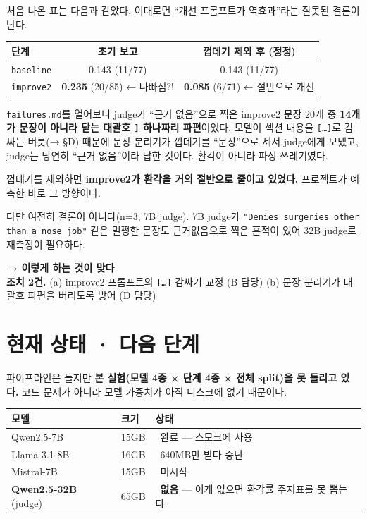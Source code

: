 \documentclass[10.5pt,a4paper]{article}
\renewcommand{\emph}[1]{{\color{muted}#1}}
\newcommand{\proposal}[1]{%
\begin{tcolorbox}[enhanced, breakable, colback=softgray, boxrule=0pt, frame hidden,
  borderline west={3pt}{0pt}{navy}, arc=0pt,
  left=12pt, right=10pt, top=8pt, bottom=8pt, before skip=12pt, after skip=8pt,
  before upper={\setlength{\parskip}{0.7em}\setlength{\parindent}{0pt}}]
{\bfseries\color{navy}→ 이렇게 하는 것이 맞다}\\[3pt]#1
\end{tcolorbox}}
\newcommand{\hl}[1]{\textbf{\color{accent}#1}}
\newcommand{\yes}{\textcolor{okgreen}{\ding{51}}}
\newcommand{\no}{\textcolor{accent}{\ding{55}}}
\newcommand{\subhead}[1]{\par\vspace{1.0em}{\bfseries\color{navy}#1}\par\vspace{-0.15em}}
\begin{document}
\subhead{정정 — 초기 수치는 측정 버그였다}

처음 나온 표는 다음과 같았다. 이대로면 ``개선 프롬프트가 역효과''라는 잘못된 결론이 난다.

\begin{center}\small
\begin{tabular}{@{}lcc@{}}
\toprule
\textbf{단계} & \textbf{초기 보고} & \textbf{껍데기 제외 후 (정정)} \\
\midrule
\texttt{baseline} & 0.143 (11/77) & 0.143 (11/77) \\
\texttt{improve2} & \hl{0.235} (20/85) ← 나빠짐?! & \textcolor{okgreen}{\textbf{0.085}} (6/71) ← 절반으로 개선 \\
\bottomrule
\end{tabular}
\end{center}

\texttt{failures.md}를 열어보니 judge가 ``근거 없음''으로 찍은 improve2 문장 20개 중 \hl{14개가 문장이 아니라 닫는 대괄호 \texttt{]} 하나짜리 파편}이었다. 모델이 섹션 내용을 \texttt{[\ldots]}로 감싸는 버릇(→ §D) 때문에 문장 분리기가 껍데기를 ``문장''으로 세서 judge에게 보냈고, judge는 당연히 ``근거 없음''이라 답한 것이다. 환각이 아니라 파싱 쓰레기였다.

껍데기를 제외하면 \textbf{improve2가 환각을 거의 절반으로 줄이고 있었다.} 프로젝트가 예측한 바로 그 방향이다.

다만 여전히 결론이 아니다(n=3, 7B judge). 7B judge가 \texttt{"Denies surgeries other than a nose job"} 같은 멀쩡한 문장도 근거없음으로 찍은 흔적이 있어 32B judge로 재측정이 필요하다.

\proposal{
\textbf{조치 2건.}
(a) improve2 프롬프트의 \texttt{[\ldots]} 감싸기 교정 \emph{(B 담당)}
(b) 문장 분리기가 대괄호 파편을 버리도록 방어 \emph{(D 담당)}
}

\section{현재 상태 · 다음 단계}

파이프라인은 돌지만 \textbf{본 실험(모델 4종 × 단계 4종 × 전체 split)을 못 돌리고 있다.} 코드 문제가 아니라 모델 가중치가 아직 디스크에 없기 때문이다.

\begin{center}\small
\begin{tabular}{@{}llp{5.4cm}@{}}
\toprule
\textbf{모델} & \textbf{크기} & \textbf{상태} \\
\midrule
Qwen2.5-7B & 15GB & \yes~\textcolor{okgreen}{완료} — 스모크에 사용 \\
Llama-3.1-8B & 16GB & \no~640MB만 받다 중단 \\
Mistral-7B & 15GB & \no~미시작 \\
\textbf{Qwen2.5-32B} (judge) & 65GB & \no~\hl{없음} — 이게 없으면 환각률 주지표를 못 뽑는다 \\
\bottomrule
\end{tabular}
\end{center}
\end{document}
